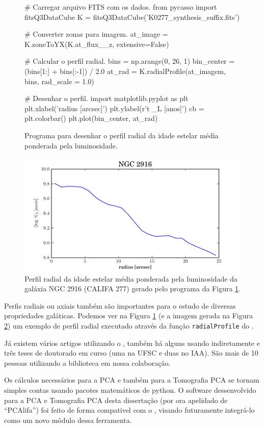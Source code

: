 \begin{figure}
	\begin{python}
# Carregar arquivo FITS com os dados.
from pycasso import fitsQ3DataCube
K = fitsQ3DataCube('K0277_synthesis_suffix.fits')

# Converter zonas para imagem.
at_image = K.zoneToYX(K.at_flux__z, extensive=False)

# Calcular o perfil radial.
bins = np.arange(0, 26, 1)
bin_center = (bins[1:] + bins[:-1]) / 2.0
at_rad = K.radialProfile(at_imagem, bins, rad_scale = 1.0)

# Desenhar o perfil.
import matplotlib.pyplot as plt
plt.xlabel('radius [arcsec]')
plt.ylabel(r'\langle \log t \langle_L [anos]')
cb = plt.colorbar()
plt.plot(bin_center, at_rad)
	\end{python}
	\caption[Exemplo de programa para perfil radial.]
	{Programa para desenhar o perfil radial da idade estelar média ponderada pela
	luminosidade.}
	\label{fig:programaPerfRad}
\end{figure}

\begin{figure}
	\includegraphics{figuras/at_flux_radprof.pdf}
	\caption[Perfil radial da idade estelar média da galáxia NGC 2916 (CALIFA 277).]
	{Perfil radial da idade estelar média ponderada pela luminosidade da galáxia
	NGC 2916 (CALIFA 277) gerado pelo programa da Figura \ref{fig:programaPerfRad}.}
	\label{fig:perfRad}
\end{figure}

Perfis radiais ou axiais também são importantes para o estudo de diversas propriedades galáticas. Podemos ver na Figura
\ref{fig:programaPerfRad} (e a imagem gerada na Figura \ref{fig:perfRad}) um exemplo de perfil radial executado
através da função \texttt{radialProfile} do \pycasso.

Já existem vários artigos utilizando o \pycasso \citep{CidFernandes2013, CidFernandes2014, Perez2013,
GonzalezDelgado2014}, também há alguns usando indiretamente \citep{Husemann2013, IglesiasParamo2013} e três teses de
doutorado em curso (uma na UFSC e duas no IAA). São mais de 10 pessoas utilizando a biblioteca em nossa colaboração. 

Os cálculos necessários para a PCA e também para a Tomografia PCA se tornam simples contas usando pacotes matemáticos de
python. O software dessenvolvido para a PCA e Tomografia PCA desta dissertação (por ora apelidado de ``PCAlifa'') foi
feito de forma compativel com o \pycasso, visando futuramente integrá-lo como um novo módulo dessa ferramenta.

